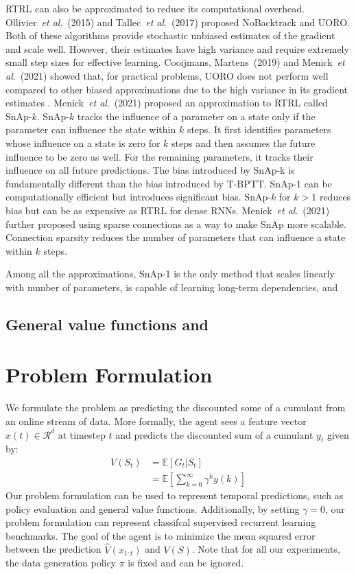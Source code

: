 \documentclass[twoside,11pt]{article}
\newcommand{\etal}{\textit{et al}.}
\begin{document}
RTRL can also be approximated to reduce its computational overhead. Ollivier~\etal~(2015) and Tallec~\etal~(2017) proposed NoBacktrack and UORO. Both of these algorithms provide stochastic unbiased estimates of the gradient and scale well. However, their estimates have high variance and require extremely small step sizes for effective learning. Cooijmans, Martens~(2019) and Menick~\etal~(2021) showed that, for practical problems, UORO does not perform well compared to other biased approximations due to the high variance in its gradient estimates . Menick~\etal~(2021) proposed an approximation to RTRL called SnAp-$k$. SnAp-$k$ tracks the influence of a parameter on a state only if the parameter can influence the state within $k$ steps. It first identifies parameters whose influence on a state is zero for $k$ steps and then assumes the future influence to be zero as well. For the remaining parameters, it tracks their influence on all future predictions. The bias introduced by SnAp-k is fundamentally different than the bias introduced by T-BPTT. SnAp-1 can be computationally efficient but introduces significant bias. SnAp-$k$ for $k>1$ reduces bias but can be as expensive as RTRL for dense RNNs.  Menick~\etal~(2021) further proposed using sparse connections as a way to make SnAp more scalable. Connection sparsity reduces the number of parameters that can influence a state within $k$ steps. 

Among all the approximations, SnAp-1 is the only method that scales linearly with number of parameters, is capable of learning long-term dependencies, and 

\subsection{General value functions and }
\section{Problem Formulation} 
We formulate the problem as predicting the discounted some of a cumulant from an online stream of data. More formally, the agent sees a feature vector $x(t)\in \mathcal{R}^d$ at timestep $t$ and predicts the discounted sum of a cumulant $y_t$ given by: 
\begin{equation}
\begin{aligned}
V(S_t) & = \mathbb{E}[G_t | S_t] \\
& = \mathbb{E}[\sum_{k = 0}^{\infty} \gamma^k y(k)]
\end{aligned}
\end{equation}
Our problem formulation can be used to represent temporal predictions, such as policy evaluation and general value functions. Additionally, by setting $\gamma = 0$, our problem formulation can represent classifcal supervised recurrent learning benchmarks. The goal of the agent is to minimize the mean squared error between the prediction $\hat{V}(x_{1:t})$ and $V(S)$. Note that for all our experiments, the data generation policy $\pi$ is fixed and can be ignored. 
\end{document}

